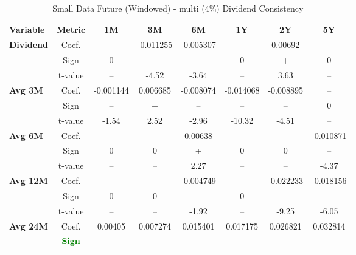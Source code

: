 \documentclass[11pt,english,a4paper,hidelinks]{book}
\begin{document}
\begin{table}[H]
    \centering
    \caption{Small Data Future (Windowed) - \acrshort{multi} (4\%) Dividend Consistency}
    \begin{tabular}{lccccccc}
        \toprule
        \textbf{Variable} & \textbf{Metric} & \textbf{1M} & \textbf{3M} & \textbf{6M} & \textbf{1Y} & \textbf{2Y} & \textbf{5Y} \\
        \midrule
        \multirow{3}{*}{\textbf{Dividend}}
            & Coef.   & --        & -0.011255 & -0.005307 & --        & 0.00692   & --        \\
            & Sign    & 0         & –         & –         & 0         & +         & 0         \\
            & t-value & --        & -4.52     & -3.64     & --        & 3.63      & --        \\
        \cmidrule{1-8}
        \multirow{3}{*}{\textbf{Avg 3M}}
            & Coef.   & -0.001144 & 0.006685  & -0.008074 & -0.014068 & -0.008895 & --        \\
            & Sign    & –         & +         & –         & –         & –         & 0         \\
            & t-value & -1.54     & 2.52      & -2.96     & -10.32    & -4.51     & --        \\
        \cmidrule{1-8}
        \multirow{3}{*}{\textbf{Avg 6M}}
            & Coef.   & --        & --        & 0.00638   & --        & --        & -0.010871 \\
            & Sign    & 0         & 0         & +         & 0         & 0         & –         \\
            & t-value & --        & --        & 2.27      & --        & --        & -4.37     \\
        \cmidrule{1-8}
        \multirow{3}{*}{\textbf{Avg 12M}}
            & Coef.   & --        & --        & -0.004749 & --        & -0.022233 & -0.018156 \\
            & Sign    & 0         & 0         & –         & 0         & –         & –         \\
            & t-value & --        & --        & -1.92     & --        & -9.25     & -6.05     \\
        \cmidrule{1-8}
        \multirow{3}{*}{\textbf{Avg 24M}}
            & Coef.   & 0.00405   & 0.007274  & 0.015401  & 0.017175  & 0.026821  & 0.032814  \\
            & \textbf{\textcolor{green}{Sign}}

\end{tabular}
\end{table}
\end{document}
